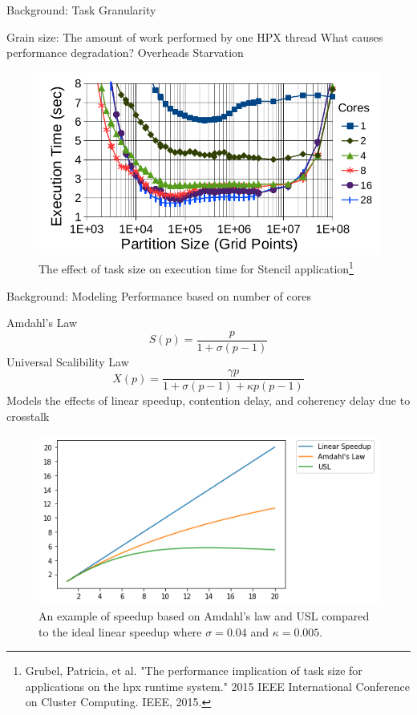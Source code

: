 \documentclass[10pt]{beamer}
\begin{document}
%		

\begin{frame}{Background: Task Granularity}
	\begin{outline}
		Grain size: The amount of work performed by one HPX thread
		\1What causes performance degradation?
		\2Overheads
		\2Starvation
		\begin{figure}
			\centering
			\includegraphics[width=0.72\linewidth]{images/task_granularity.png}
			\caption{The effect of task size on execution time for Stencil application\footnote{Grubel, Patricia, et al. "The performance implication of task size for applications on the hpx runtime system." 2015 IEEE International Conference on Cluster Computing. IEEE, 2015.}}	
	
		\end{figure}
		
	\end{outline}
\end{frame}


\begin{frame}{Background: Modeling Performance based on number of cores}
	\begin{outline}
		\1Amdahl's Law
			$$S(p) = \frac{p}{1+\sigma(p-1)}$$
		\1Universal Scalibility Law
		$$X(p) = \frac{\gamma{p}}{1+\sigma(p-1)+\kappa{p}(p-1)}$$
		\2 Models the effects
		of linear speedup, contention delay, and coherency delay due to crosstalk
		\begin{figure}[H]
			\centering
			\includegraphics[scale=0.38]{images/amdahls.png}
			\caption{An example of speedup based on Amdahl's law and USL compared to the ideal linear speedup where $\sigma=0.04$ and $\kappa=0.005$.}	
			\label{fig_Amdahl}
		\end{figure}
		

	\end{outline}
\end{frame}
\end{document}

